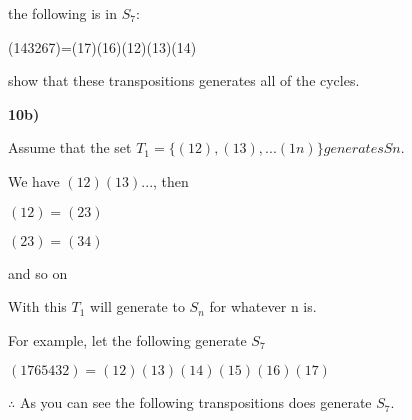 \documentclass{article}
\begin{document}
\begin{center}
the following is in $S_7$:

 (143267)=(17)(16)(12)(13)(14) 
 \end{center}

show that these transpositions generates all of the cycles.

\bigskip

\textbf{10b)}

Assume that the set $T_1=\{(12),(13), . . . (1n)\}  generates  Sn.$

We have $(12)(13)...$, then 

\begin{center}
$(12)=(23) $

\medskip

$(23)=(34)$

and so on
\end{center}

With this $T_1$ will generate to $S_n$ for whatever n is.

\bigskip

For example, let the following generate $S_7$
\bigskip


\begin{center}
\medskip
$(1765432)=(12)(13)(14)(15)(16)(17)$
\end{center}

$\therefore$ As you can see the following transpositions does generate $S_7$.






	

\end{document}
